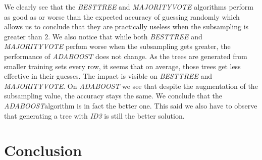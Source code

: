 \documentclass[french]{article}
\begin{document}
	We clearly see that the \emph{BESTTREE} and \emph{MAJORITYVOTE} algorithms perform as good as or worse than the expected accuracy of guessing randomly which allows us to conclude that they are practically useless when the subsampling is greater than $2$.  We also notice that while both \emph{BESTTREE} and \emph{MAJORITYVOTE} perfom worse when the subsampling gets greater, the performance of \emph{ADABOOST} does not change. As the trees are generated from smaller training sets every row, it seems that on average, those trees get less effective in their guesses. The impact is visible on \emph{BESTTREE} and \emph{MAJORITYVOTE}. On \emph{ADABOOST} we see that despite the augmentation of the subsampling value, the accuracy stays the same. We conclude that the \emph{ADABOOST}algorithm is in fact the better one. This said we also have to observe that generating a tree with \emph{ID3} is still the better solution.
\section{Conclusion}
\end{document}
